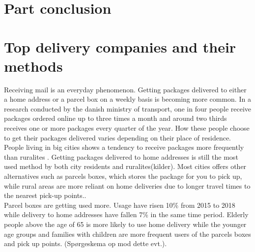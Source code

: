 \documentclass[12pt]{report}
\begin{document}
 

\section{Part conclusion}




\section{Top delivery companies and their methods}
Receiving mail is an everyday phenomenon. Getting packages delivered to either a home address or a parcel box on a weekly basis is becoming more common. In a research conducted by the danish ministry of transport, one in four people receive packages ordered online up to three times a month and around two thirds receives one or more packages every quarter of the year\cite{reportDKpakketjenester}. How these people choose to get their packages delivered varies depending on their place of residence. People living in big cities shows a tendency to receive packages more frequently than ruralites \cite{reportDKpakketjenester}. Getting packages delivered to home addresses is still the most used method by both city residents and ruralites(kilder). Most cities offers other alternatives such as parcels boxes, which stores the package for you to pick up, while rural areas are more reliant on home deliveries due to longer travel times to the nearest pick-up points.\cite{reportDKpakketjenester}.\\\hspace*{5 mm}
Parcel boxes are getting used more. Usage have risen 10\% from 2015 to 2018 while delivery to home addresses have fallen 7\% in the same time period. Elderly people above the age of 65 is more likely to use home delivery while the younger age groups and families with children are more frequent users of the parcels boxes and pick up points\cite{FDIHyearreport}.
(Spørgeskema op mod dette evt.).
\end{document}
